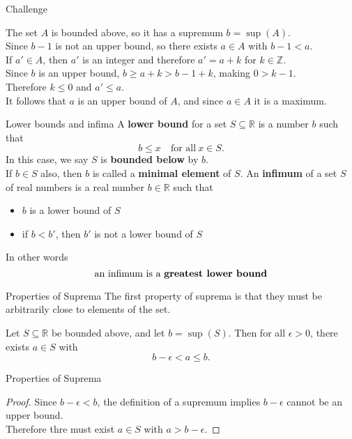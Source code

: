 \documentclass{beamer}
\begin{document}
\begin{frame}{Challenge}
\begin{soln}
The set $A$ is bounded above, so it has a supremum $b=\sup(A)$. \\
\pause
Since $b-1$ is not an upper bound, so there exists $a\in A$ with $b-1 < a$. \\
\pause
If $a'\in A$, then $a'$ is an integer and therefore $a' = a+k$ for $k\in \mathbb{Z}$. \\
\pause
Since $b$ is an upper bound, $b\geq a+k>b-1+k$, making $0 > k-1$. \\
\pause
Therefore $k\leq 0$ and $a'\leq a$. \\
\pause
It follows that $a$ is an upper bound of $A$, and since $a\in A$ it is a maximum.
\end{soln}
\end{frame}

\begin{frame}{Lower bounds and infima}
A \textbf{lower bound} for a set $S\subseteq\mathbb{R}$ is a number $b$ such that
$$b \leq x\quad\text{for all}\ x\in S.$$
\pause
In this case, we say $S$ is \textbf{bounded below} by $b$.\\
\pause
If $b\in S$ also, then $b$ is called a \textbf{minimal element} of $S$.
\pause
An \textbf{infimum} of a set $S$ of real numbers is a real number $b\in\mathbb{R}$ such that
\begin{itemize}
\item $b$ is a lower bound of $S$
\item if $b<b'$, then $b'$ is not a lower bound of $S$
\end{itemize}
\pause
In other words
$$\text{an infimum is a \bf{greatest lower bound}}$$
\end{frame}

\begin{frame}{Properties of Suprema}
The first property of suprema is that they must be arbitrarily close to elements of the set.
\begin{thm}
Let $S\subseteq\mathbb{R}$ be bounded above, and let $b = \sup(S)$.
Then for all $\epsilon > 0$, there exists $a\in S$ with
$$b-\epsilon < a \leq b.$$
\end{thm}
\end{frame}
\begin{frame}{Properties of Suprema}
\begin{proof}
Since $b-\epsilon < b$, the definition of a supremum implies $b-\epsilon$ cannot be an upper bound.\\
\pause
Therefore thre must exist $a\in S$ with $a > b-\epsilon$.
\end{proof}
\end{frame}
\end{document}
